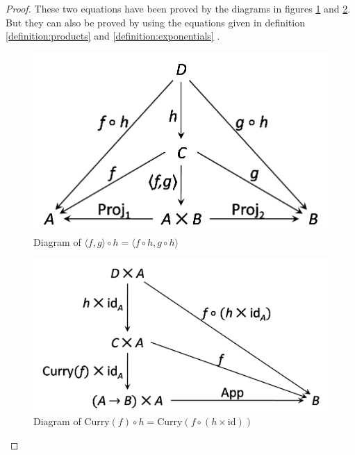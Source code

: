 \begin{proof}
These two equations have been proved by the diagrams in figures \ref{figure:cat_eqn1} and \ref{figure:cat_eqn2}. But they can also be proved by using the equations given in definition \ref{definition:products} and \ref{definition:exponentials} .

\begin{figure}[h!]
\centering
\includegraphics[scale=0.48]{./images/cat_eqn1}
\caption{Diagram of $ \langle f,g \rangle \circ h = \langle f \circ h , g \circ h \rangle $}
\label{figure:cat_eqn1}
\end{figure}
\begin{figure}[h!]
\centering
\includegraphics[scale=0.48]{./images/cat_eqn2}
\caption{Diagram of $ \text{Curry}(f) \circ h = \text{Curry}(f \circ (h \times \text{id})) $}
\label{figure:cat_eqn2}
\end{figure}


\end{proof}
